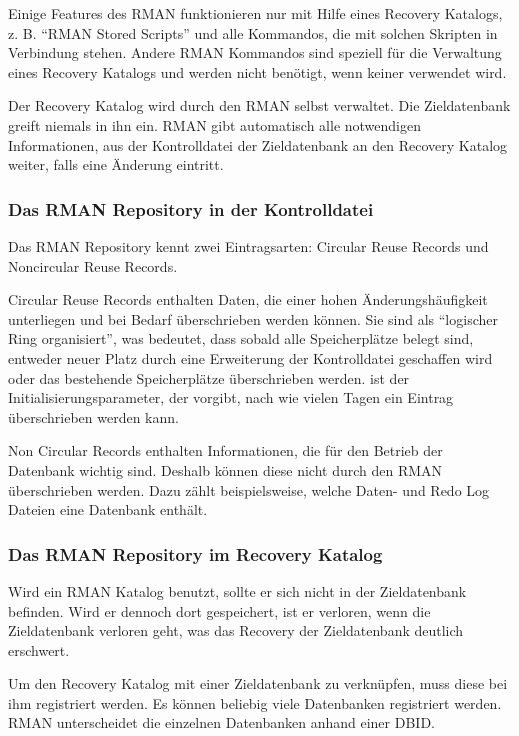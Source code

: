         Einige Features des RMAN funktionieren nur mit Hilfe eines Recovery Katalogs, z. B. \enquote{RMAN Stored Scripts} und alle Kommandos, die mit solchen Skripten in Verbindung stehen. Andere RMAN Kommandos sind speziell f\"ur die Verwaltung eines Recovery Katalogs und werden nicht ben\"otigt, wenn keiner verwendet wird.

        Der Recovery Katalog wird durch den RMAN selbst verwaltet. Die Zieldatenbank greift niemals in ihn ein. RMAN gibt automatisch alle notwendigen Informationen, aus der Kontrolldatei der Zieldatenbank an den Recovery Katalog weiter, falls eine \"Anderung eintritt.
        \subsubsection{Das RMAN Repository in der Kontrolldatei}
          Das RMAN Repository kennt zwei Eintragsarten: Circular Reuse Records und Noncircular Reuse Records.

          Circular Reuse Records enthalten Daten, die einer hohen \"Anderungsh\"aufigkeit unterliegen und bei Bedarf \"uberschrieben werden k\"onnen. Sie sind als \enquote{logischer Ring organisiert}, was bedeutet, dass sobald alle Speicherpl\"atze belegt sind, entweder neuer Platz durch eine Erweiterung der Kontrolldatei geschaffen wird oder das bestehende Speicherpl\"atze \"uberschrieben werden.  ist der Initialisierungsparameter, der vorgibt, nach wie vielen Tagen ein Eintrag \"uberschrieben werden kann.

          Non Circular Records enthalten Informationen, die f\"ur den Betrieb der Datenbank wichtig sind. Deshalb k\"onnen diese nicht durch den RMAN \"uberschrieben werden. Dazu z\"ahlt beispielsweise, welche Daten- und Redo Log Dateien eine Datenbank enth\"alt.
        \subsubsection{Das RMAN Repository im Recovery Katalog}
         Wird ein RMAN Katalog benutzt, sollte er sich nicht in der Zieldatenbank befinden. Wird er  dennoch dort gespeichert, ist er verloren, wenn die Zieldatenbank verloren geht, was das Recovery der Zieldatenbank deutlich erschwert.

          Um den Recovery Katalog mit einer Zieldatenbank zu verkn\"upfen, muss diese bei ihm registriert werden. Es k\"onnen beliebig viele Datenbanken registriert werden. RMAN unterscheidet die einzelnen Datenbanken anhand einer DBID.

